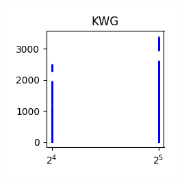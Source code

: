 \documentclass[sigconf,authorversion]{acmart}
\begin{document}
\begin{figure}[htb]
\begin{subfigure}[b]{0.3\textwidth}
        \label{fig:nwg}
    \end{subfigure}
    \begin{subfigure}[b]{0.3\textwidth}
        \includegraphics[width=\textwidth]{img/KWG.png}
        \label{fig:kwg}
    \end{subfigure}
\end{figure}
\end{document}
